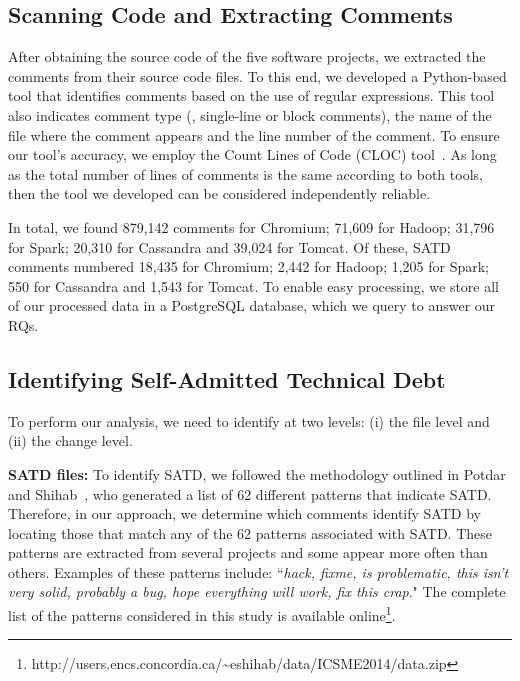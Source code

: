 
\subsection{Scanning Code and Extracting Comments}
After obtaining the source code of the five software projects, we extracted the comments from their source code files. To this end, we developed a Python-based tool that identifies comments based on the use of regular expressions. This tool also indicates comment type (\ie{}, single-line or block comments), the name of the file where the comment appears and the line number of the comment. To ensure our tool's accuracy, we employ the Count Lines of Code (CLOC) tool~\cite{cloc}. As long as the total number of lines of comments is the same according to both tools, then the tool we developed can be considered independently reliable.

In total, we found 879,142 comments for Chromium; 71,609 for Hadoop; 31,796 for Spark; 20,310 for Cassandra and 39,024 for Tomcat. Of these, SATD comments numbered 18,435 for Chromium; 2,442 for Hadoop; 1,205 for Spark; 550 for Cassandra and 1,543 for Tomcat. To enable easy processing, we store all of our processed data in a PostgreSQL database, which we query to answer our RQs.


\subsection{Identifying Self-Admitted Technical Debt}
\label{td}
To perform our analysis, we need to identify \SATD at two levels: (i) the file level and (ii) the change level.



\noindent\textbf{SATD files:} To identify SATD, we followed the methodology outlined in Potdar and Shihab~\cite{ICSM_PotdarS14}, who generated a list of 62 different patterns that indicate SATD. Therefore, in our approach, we determine which comments identify SATD by locating those that match any of the 62 patterns associated with SATD. These patterns are extracted from several projects and some appear more often than others. Examples of these patterns include: ``\textit{hack, fixme, is problematic, this isn't very solid, probably a bug, hope everything will work, fix this crap}." The complete list of the patterns considered in this study is available online\footnote{http://users.encs.concordia.ca/\textasciitilde eshihab/data/ICSME2014/data.zip}.

